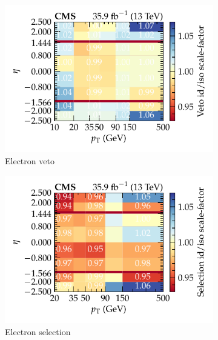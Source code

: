 \begin{figure}[htb]
    \centering
    \begin{subfigure}[b]{0.49\textwidth}
        \centering
        \includegraphics{chapters/041_corrections/images/efficiencies/objects/electrons/electron_idiso_veto_sf.pdf}
        \caption{Electron veto}
        \label{subfiga:egamma-id-iso-efficiency}
    \end{subfigure}
    \hfill
    \begin{subfigure}[b]{0.49\textwidth}
        \centering
        \includegraphics{chapters/041_corrections/images/efficiencies/objects/electrons/electron_idiso_tight_sf.pdf}
        \caption{Electron selection}
        \label{subfigb:egamma-id-iso-efficiency}
    \end{subfigure}
    \\
    \begin{subfigure}[b]{0.49\textwidth}

\end{subfigure}
\end{figure}

